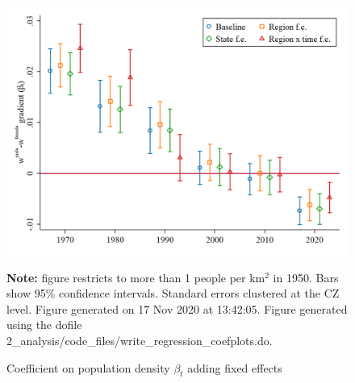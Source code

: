 \begin{figure}[!h]
\centering
\caption{Coefficient on population density $ \beta_t $ adding fixed effects}
\includegraphics[width=1\textwidth]{../2_analysis/output/figures/baseline_fe_l_czone_density_full_time}
\par \begin{minipage}[h]{\textwidth}{\tiny\textbf{Note:} figure restricts to more than 1 people per km$^2$ in 1950. Bars show 95\% confidence intervals. Standard errors clustered at the CZ level. Figure generated on 17 Nov 2020 at 13:42:05. Figure generated using the dofile 2\_analysis/code\_files/write\_regression\_coefplots.do.}\end{minipage}
\end{figure}
